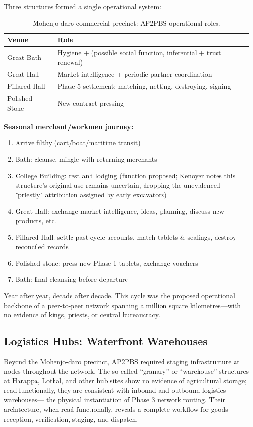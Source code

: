 \documentclass[12pt]{article}
\begin{document}
Three structures formed a single operational system:

\begin{table}[H]
\centering
\caption{Mohenjo-daro commercial precinct: AP2PBS operational roles.}
\begin{tabular}{@{}ll@{}}
\toprule
\textbf{Venue} & \textbf{Role} \\
\midrule
Great Bath & Hygiene + (possible social function, inferential + trust renewal) \\
Great Hall & Market intelligence + periodic partner coordination \\
Pillared Hall & Phase 5 settlement: matching, netting, destroying, signing \\
Polished Stone & New contract pressing \\
\bottomrule
\end{tabular}
\end{table}
\textbf{Seasonal merchant/workmen journey:}
\begin{enumerate}
\item Arrive filthy (cart/boat/maritime transit)
\item Bath: cleanse, mingle with returning merchants
\item College Building: rest and lodging (function proposed; Kenoyer notes
      this structure's original use remains uncertain, dropping the
      unevidenced "priestly" attribution assigned by early excavators)
\item Great Hall: exchange market intelligence, ideas, planning, discuss new products, etc.
\item Pillared Hall: settle past-cycle accounts, match tablets \& sealings, destroy reconciled records
\item Polished stone: press new Phase 1 tablets, exchange vouchers
\item Bath: final cleansing before departure
\end{enumerate}

Year after year, decade after decade. This cycle was the proposed operational
backbone of a peer-to-peer network spanning a million square kilometres---with
no evidence of kings, priests, or central bureaucracy.

\subsection{Logistics Hubs: Waterfront Warehouses}

Beyond the Mohenjo-daro precinct, AP2PBS required staging infrastructure at
nodes throughout the network.  The so-called ``granary'' or ``warehouse'' 
structures at Harappa, Lothal, and other hub sites show no evidence of agricultural
storage; read functionally, they are consistent with inbound and outbound logistics
warehouses--- the physical instantiation of Phase 3 network routing. Their
architecture, when read functionally, reveals a complete workflow for goods reception,
verification, staging, and dispatch.
\end{document}
